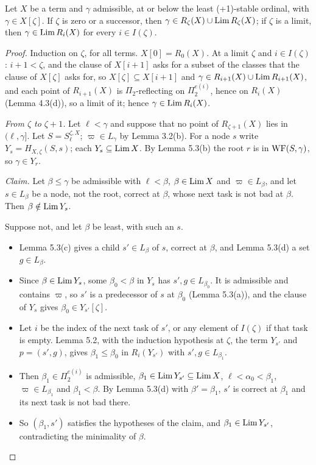\documentclass[11pt]{article}
\begin{document}
\begin{statement} Let $X$ be a term and $\gamma$ admissible, at or below the least
(+1)-stable ordinal, with $\gamma \in
X[\zeta]$. If $\zeta$ is zero or a successor, then $\gamma \in R_\zeta(X) \cup \mathrm{Lim}\, R_\zeta(X)$; if $\zeta$ is a limit,
then $\gamma \in \mathrm{Lim}\, R_i(X)$ for every $i \in I(\zeta)$.
\end{statement}

\begin{proof}
Induction on $\zeta$, for all terms. $X[0] = R_0(X)$. At a limit $\zeta$ and $i \in I(\zeta)$: $i+1 < \zeta$, and the
clause of $X[i+1]$ asks for a subset of the classes that the clause of $X[\zeta]$ asks for, so $X[\zeta] \subseteq
X[i+1]$ and $\gamma \in R_{i+1}(X) \cup \mathrm{Lim}\, R_{i+1}(X)$, and each point of $R_{i+1}(X)$ is $\Pi_2$-reflecting on $\Pi_2^{e(i)}$, hence on
$R_i(X)$ (Lemma 4.3(d)), so a limit of it; hence $\gamma \in \mathrm{Lim}\, R_i(X)$.

\emph{From $\zeta$ to $\zeta+1$.} Let $\ell < \gamma$ and suppose that no point of $R_{\zeta+1}(X)$ lies in $(\ell,
\gamma]$. Let $S = S^{\zeta,X}_\ell$; $\varpi \in L_\gamma$ by Lemma 3.2(b). For a node $s$ write $Y_s =
H_{X,\zeta}(S,s)$; each $Y_s \subseteq \mathrm{Lim}\, X$. By Lemma 5.3(b) the root $r$ is in $\mathrm{WF}(S,\gamma)$, so $\gamma \in
Y_r$.

\emph{Claim.} Let $\beta \le \gamma$ be admissible with $\ell < \beta$, $\beta \in \mathrm{Lim}\, X$ and $\varpi \in L_\beta$, and
let $s \in L_\beta$ be a node, not the root, correct at $\beta$, whose next task is not bad at $\beta$. Then $\beta
\notin \mathrm{Lim}\, Y_s$.

Suppose not, and let $\beta$ be least, with such an $s$.
\begin{itemize}
\item Lemma 5.3(c) gives a child $s' \in L_\beta$ of $s$, correct at $\beta$, and Lemma 5.3(d) a set $g \in L_\beta$.
\item Since $\beta \in \mathrm{Lim}\, Y_s$, some $\beta_0 < \beta$ in $Y_s$ has $s', g \in L_{\beta_0}$. It is admissible and
  contains $\varpi$, so $s'$ is a predecessor of $s$ at $\beta_0$ (Lemma 5.3(a)), and the clause of $Y_s$ gives $\beta_0
  \in Y_{s'}[\zeta]$.
\item Let $i$ be the index of the next task of $s'$, or any element of $I(\zeta)$ if that task is empty. Lemma 5.2, with
  the induction hypothesis at $\zeta$, the term $Y_{s'}$ and $p = (s',g)$, gives $\beta_1 \le \beta_0$ in
  $R_i(Y_{s'})$ with $s', g \in L_{\beta_1}$.
\item Then $\beta_1 \in \Pi_2^{e(i)}$ is admissible, $\beta_1 \in \mathrm{Lim}\, Y_{s'} \subseteq \mathrm{Lim}\, X$, $\ell < \alpha_0 < \beta_1$,
  $\varpi \in L_{\beta_1}$ and $\beta_1 < \beta$. By Lemma 5.3(d) with $\beta' = \beta_1$, $s'$ is correct at $\beta_1$ and
  its next task is not bad there.
\item So $(\beta_1, s')$ satisfies the hypotheses of the claim, and $\beta_1 \in \mathrm{Lim}\, Y_{s'}$, contradicting the
  minimality of $\beta$.
\end{itemize}


\end{proof}
\end{document}
